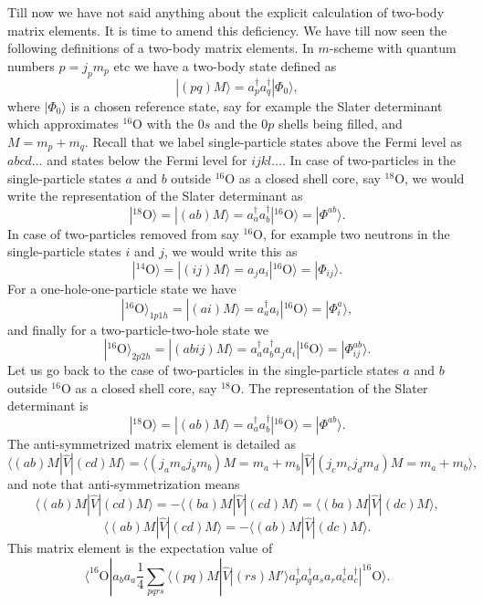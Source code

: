 \documentclass[graybox,sectrefs,envcountresetchap,open=right]{svmonodo}
\begin{document}
Till now we have not said anything about the explicit calculation of two-body matrix elements. It is time to amend this deficiency.
We have till now seen the following definitions of a two-body matrix elements. In $m$-scheme
with quantum numbers $p=j_pm_p$ etc we have a two-body state defined as
\[
|(pq)M\rangle  = a^{\dagger}_pa^{\dagger}_q|\Phi_0\rangle,
\]
where $|\Phi_0\rangle$ is a chosen reference state, say for example the Slater determinant which approximates ${}^{16}\mbox{O}$ with the $0s$ and the $0p$ shells being filled, and $M=m_p+m_q$. Recall that we label single-particle states above the Fermi level as $abcd\dots$ and states below the Fermi level for $ijkl\dots$.  
In case of two-particles in the single-particle states $a$ and $b$ outside ${}^{16}\mbox{O}$ as a closed shell core, say ${}^{18}\mbox{O}$, 
we would write the representation of the Slater determinant as
\[
|^{18}\mathrm{O}\rangle =|(ab)M\rangle  = a^{\dagger}_aa^{\dagger}_b|^{16}\mathrm{O}\rangle=|\Phi^{ab}\rangle.
\]
In case of two-particles removed from say ${}^{16}\mbox{O}$, for example two neutrons in the single-particle states $i$ and $j$, we would write this as
\[
|^{14}\mathrm{O}\rangle =|(ij)M\rangle  = a_ja_i|^{16}\mathrm{O}\rangle=|\Phi_{ij}\rangle.
\]
For a one-hole-one-particle state we have
\[
|^{16}\mathrm{O}\rangle_{1p1h} =|(ai)M\rangle  = a_a^{\dagger}a_i|^{16}\mathrm{O}\rangle=|\Phi_{i}^a\rangle,
\]
and finally for a two-particle-two-hole state we 
\[
|^{16}\mathrm{O}\rangle_{2p2h} =|(abij)M\rangle  = a_a^{\dagger}a_b^{\dagger}a_ja_i|^{16}\mathrm{O}\rangle=|\Phi_{ij}^{ab}\rangle.
\]
Let us go back to the case of two-particles in the single-particle states $a$ and $b$ outside ${}^{16}\mbox{O}$ as a closed shell core, say ${}^{18}\mbox{O}$.
The representation of the Slater determinant is 
\[
|^{18}\mathrm{O}\rangle =|(ab)M\rangle  = a^{\dagger}_aa^{\dagger}_b|^{16}\mathrm{O}\rangle=|\Phi^{ab}\rangle.
\]
The anti-symmetrized matrix element is detailed as 
\[
\langle (ab) M | \hat{V} | (cd) M \rangle = \langle (j_am_aj_bm_b)M=m_a+m_b |  \hat{V} | (j_cm_cj_dm_d)M=m_a+m_b \rangle,
\]
and note that anti-symmetrization means 
\[
\langle (ab) M | \hat{V} | (cd) M \rangle =-\langle (ba) M | \hat{V} | (cd) M \rangle =\langle (ba) M | \hat{V} | (dc) M \rangle,
\]
\[
\langle (ab) M | \hat{V} | (cd) M \rangle =-\langle (ab) M | \hat{V} | (dc) M \rangle. 
\]
This matrix element is the expectation value of 
\[
\langle ^{16}\mathrm{O}|a_ba_a\frac{1}{4}\sum_{pqrs}\langle (pq) M | \hat{V} | (rs) M' \rangle a^{\dagger}_pa^{\dagger}_qa_sa_r a^{\dagger}_ca^{\dagger}_c|^{16}\mathrm{O}\rangle.
\]
\end{document}

